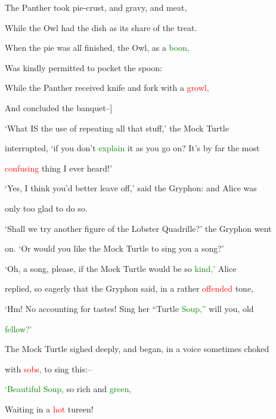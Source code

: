  The Panther took pie-crust, and gravy, and meat,

 While the Owl had the dish as its \textcolor{BurntOrange}{share} of the \textcolor{BurntOrange}{treat.}

 When the pie was all finished, the Owl, as a \textcolor{green}{boon,}

 Was kindly permitted to pocket the spoon:

 While the Panther received knife and fork with a \textcolor{red}{growl,}

 And concluded the \textcolor{BurntOrange}{banquet--]}



 ‘What IS the use of repeating all that stuff,’ the Mock Turtle

 \textcolor{BurntOrange}{interrupted,} ‘if you don’t \textcolor{green}{explain} it as you go on? It’s by far the most

 \textcolor{red}{confusing} thing I ever heard!’



 ‘Yes, I think you’d better \textcolor{BurntOrange}{leave} off,’ said the Gryphon: and Alice was

 only too \textcolor{BurntOrange}{glad} to do so.



 ‘Shall we try another figure of the Lobster Quadrille?’ the Gryphon went

 on. ‘Or would you like the Mock Turtle to \textcolor{BurntOrange}{sing} you a song?’



 ‘Oh, a song, please, if the Mock Turtle would be so \textcolor{green}{kind,’} Alice

 replied, so eagerly that the Gryphon said, in a rather \textcolor{red}{offended} tone,

 ‘Hm! No accounting for tastes! \textcolor{BurntOrange}{Sing} her “Turtle \textcolor{green}{Soup,”} will you, old

 \textcolor{green}{fellow?’}



 The Mock Turtle sighed deeply, and began, in a voice sometimes choked

 with \textcolor{red}{sobs,} to \textcolor{BurntOrange}{sing} this:--



 \textcolor{green}{‘Beautiful} \textcolor{green}{Soup,} so rich and \textcolor{green}{green,}

 \textcolor{BurntOrange}{Waiting} in a \textcolor{red}{hot} tureen!

